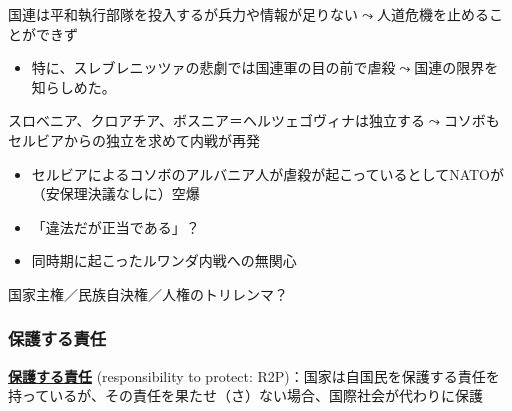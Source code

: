 \documentclass[
  xelatex,
  ja=standard]{bxjsarticle}
\providecommand{\tightlist}{%
  \setlength{\itemsep}{0pt}\setlength{\parskip}{0pt}}\usepackage{longtable,booktabs,array}
\begin{document}
国連は平和執行部隊を投入するが兵力や情報が足りない\(\leadsto\)人道危機を止めることができず

\begin{itemize}
\tightlist
\item
  特に、スレブレニッツァの悲劇では国連軍の目の前で虐殺\(\leadsto\)国連の限界を知らしめた。
\end{itemize}

スロベニア、クロアチア、ボスニア＝ヘルツェゴヴィナは独立する\(\leadsto\)コソボもセルビアからの独立を求めて内戦が再発

\begin{itemize}
\tightlist
\item
  セルビアによるコソボのアルバニア人が虐殺が起こっているとしてNATOが（安保理決議なしに）空爆
\item
  「違法だが正当である」？
\item
  同時期に起こったルワンダ内戦への無関心
\end{itemize}

国家主権／民族自決権／人権のトリレンマ？

\hypertarget{ux4fddux8b77ux3059ux308bux8cacux4efb}{%
\subsubsection{保護する責任}\label{ux4fddux8b77ux3059ux308bux8cacux4efb}}

\href{https://ir.library.osaka-u.ac.jp/repo/ouka/all/67203/}{\textbf{保護する責任}}
(responsibility to protect:
R2P)：国家は自国民を保護する責任を持っているが、その責任を果たせ（さ）ない場合、国際社会が代わりに保護
\end{document}
